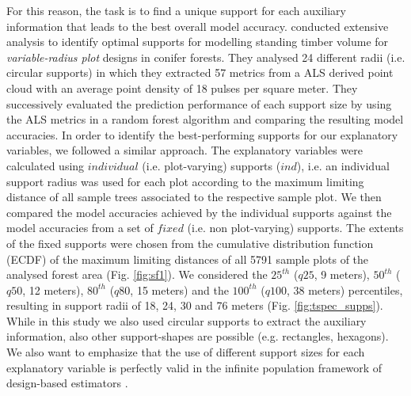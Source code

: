 For this reason, the task is to find a unique support for each auxiliary information that leads to the best overall model accuracy. \citet{deo2016} conducted extensive analysis to identify optimal supports for modelling standing timber volume for \textit{variable-radius plot} designs in conifer forests. They analysed 24 different radii (i.e. circular supports) in which they extracted 57 metrics from a ALS derived point cloud with an average point density of 18 pulses per square meter. They successively evaluated the prediction performance of each support size by using the ALS metrics in a random forest algorithm and comparing the resulting model accuracies. In order to identify the best-performing supports for our explanatory variables, we followed a similar approach. The explanatory variables were calculated using $individual$ (i.e. plot-varying) supports ($ind$), i.e. an individual support radius was used for each plot according to the maximum limiting distance of all sample trees associated to the respective sample plot. We then compared the model accuracies achieved by the individual supports against the model accuracies from a set of $fixed$ (i.e. non plot-varying) supports. The extents of the fixed supports were chosen from the cumulative distribution function (ECDF) of the maximum limiting distances of all 5791 sample plots of the analysed forest area (Fig. \ref{fig:sf1}). We considered the $25^{th}$ ($q25$, 9 meters), $50^{th}$ ($q50$, 12 meters), $80^{th}$ ($q80$, 15 meters) and the $100^{th}$ ($q100$, 38 meters) percentiles, resulting in support radii of 18, 24, 30 and 76 meters (Fig. \ref{fig:tspec_supps}). While in this study we also used circular supports to extract the auxiliary information, also other support-shapes are possible (e.g. rectangles, hexagons). We also want to emphasize that the use of different support sizes for each explanatory variable is perfectly valid in the infinite population framework of design-based estimators \citep{mandallaz2013c, mandallaz2013a}.



